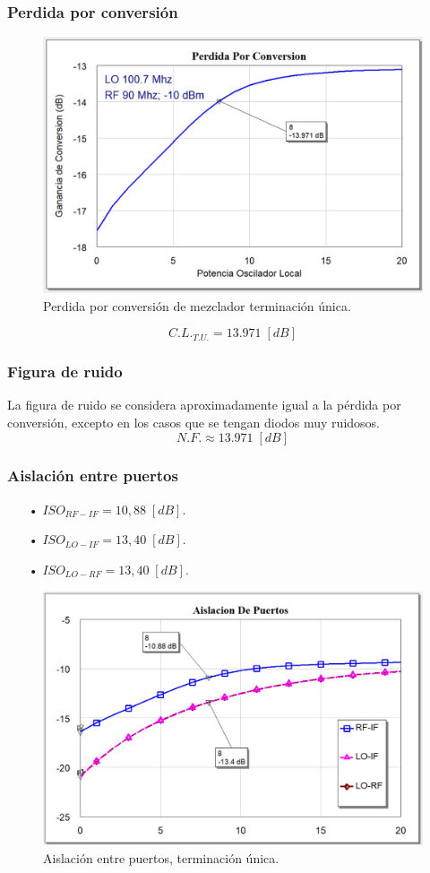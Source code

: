 \documentclass[twocolumn]{article}
\begin{document}
\subsubsection{Perdida por conversión}
%
\begin{figure}[h]
  \centering    
	\includegraphics[width=\columnwidth]{imagenes/CL1.jpg}
	\caption{Perdida por conversión de mezclador terminación única.}\label{fig:CL1}
\end{figure}
\[C.L._{T.U.} = 13.971 \; [dB] \]
%
\subsubsection{Figura de ruido}
%
La figura de ruido se considera aproximadamente igual a la pérdida por conversión, excepto en los casos que se tengan diodos muy ruidosos.
\[N.F. \approx 13.971 \; [dB] \]
%
\subsubsection{Aislación entre puertos}
%
\begin{itemize}\itemsep0em
\item[•]  $ISO_{RF-IF} = 10,88 \; [dB]$.
\item[•]  $ISO_{LO-IF} = 13,40 \; [dB]$.
\item[•]  $ISO_{LO-RF} = 13,40 \; [dB]$.
\end{itemize}
%
\begin{figure}[h]
  \centering    
	\includegraphics[width=\columnwidth]{imagenes/ISO1.jpg}
	\caption{Aislación entre puertos, terminación única.}\label{fig:ISO1}
\end{figure}
\clearpage
%
\end{document}
